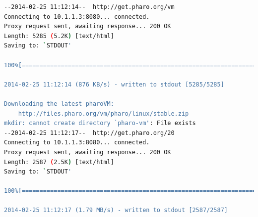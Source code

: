 \documentclass[a4paper,10pt,twoside]{book}
\begin{document}
				\begin{lstlisting}[language=bash,title={ Default package creation - output}]
--2014-02-25 11:12:14--  http://get.pharo.org/vm
Connecting to 10.1.1.3:8080... connected.
Proxy request sent, awaiting response... 200 OK
Length: 5285 (5.2K) [text/html]
Saving to: `STDOUT'

100%[========================================================================================================================================>] 5,285       --.-K/s   in 0.006s  

2014-02-25 11:12:14 (876 KB/s) - written to stdout [5285/5285]

Downloading the latest pharoVM:
	http://files.pharo.org/vm/pharo/linux/stable.zip
mkdir: cannot create directory `pharo-vm': File exists
--2014-02-25 11:12:17--  http://get.pharo.org/20
Connecting to 10.1.1.3:8080... connected.
Proxy request sent, awaiting response... 200 OK
Length: 2587 (2.5K) [text/html]
Saving to: `STDOUT'

100%[========================================================================================================================================>] 2,587       --.-K/s   in 0.001s  

2014-02-25 11:12:17 (1.79 MB/s) - written to stdout [2587/2587]


\end{lstlisting}
\end{document}
